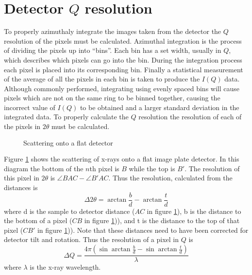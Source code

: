 \section{Detector $Q$ resolution} \label{subsec:qres}
To properly azimuthaly integrate the images taken from the detector the $Q$ resolution of the pixels must be calculated.
Azimuthal integration is the process of dividing the pixels up into ``bins''.
Each bin has a set width, usually in $Q$, which describes which pixels can go into the bin.
During the integration process each pixel is placed into its corresponding bin.
Finally a statistical measurement of the average of all the pixels in each bin is taken to produce the $I(Q)$ data.
Although commonly performed, integrating using evenly spaced bins will cause pixels which are not on the same ring to be binned together, causing the incorrect value of $I(Q)$ to be obtained and a larger standard deviation in the integrated data.
To properly calculate the $Q$ resolution the resolution of each of the pixels in $2\theta$ must be calculated.
\begin{figure}
    \centering
    \caption{Scattering onto a flat detector}
    \label{fig:scattering_digram}
\end{figure}
Figure \ref{fig:scattering_digram} shows the scattering of x-rays onto a flat image plate detector.
In this diagram the bottom of the $n$th pixel is $B$ while the top is $B'$.
The resolution of this pixel in $2\theta$ is $\angle BAC - \angle B'AC$.
Thus the resolution, calculated from the distances is
\begin{equation}
\Delta 2 \theta = \arctan{\frac{b}{d}} - \arctan{\frac{t}{d}}
\end{equation}
where d is the sample to detector distance ($AC$ in figure \ref{fig:scattering_digram}),
b is the distance to the bottom of a pixel ($CB$ in figure \ref{fig:scattering_digram})),
and t is the distance to the top of that pixel ($CB'$ in figure \ref{fig:scattering_digram})).
Note that these distances need to have been corrected for detector tilt and rotation.
Thus the resolution of a pixel in $Q$ is
\begin{equation}
\Delta Q = \frac{4\pi(\sin{\arctan{\frac{b}{d}}} - \sin{\arctan{\frac{t}{d}}})}{\lambda}
\end{equation}
where $\lambda$ is the x-ray wavelength.

